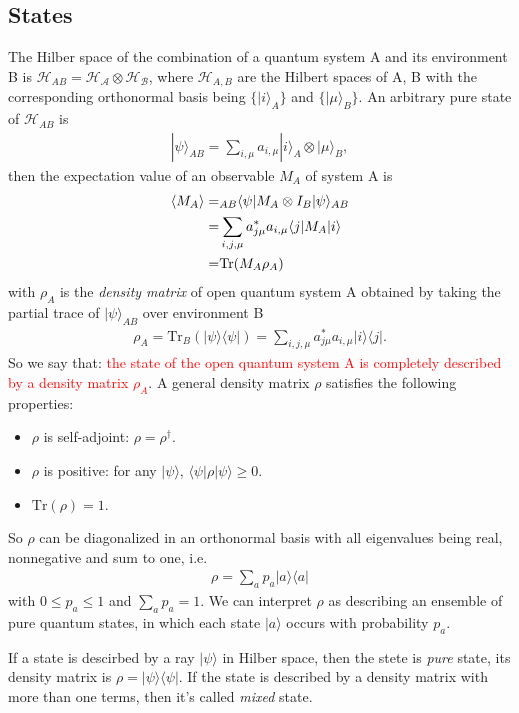 \documentclass{article}
\newcommand{\ket}[1]{| #1 \rangle}  %
\newcommand{\bra}[1]{\langle #1|} %
\newcommand{\expec}[1]{\langle #1 \rangle} %
\begin{document}
\subsection{States}
The Hilber space of the combination of a quantum system A and its environment B is $\mathcal{H}_{AB}=\mathcal{H_A}\otimes \mathcal{H_B}$, where $\mathcal{H}_{A, B}$ are the Hilbert spaces of A, B with the corresponding orthonormal basis being $\{ \ket{i}_A\}$ and $\{\ket{\mu}_B\}$. An arbitrary pure state of $\mathcal{H}_{AB}$ is 
\begin{align}
	\ket{\psi}_{AB}=\sum_{i,\mu} a_{i,\mu} \ket{i}_A \otimes \ket{\mu}_B,
\end{align}
then the expectation value of an observable $M_A$ of system A is
\begin{align}
	\expec{M_A} 
	=& {}_{AB}\bra{\psi} M_A\otimes I_B \ket{\psi}_{AB} \notag\\
	=& \sum_{i,j,\mu} a^*_{j \mu} a_{i, \mu} \bra{j}M_A\ket{i} \notag\\
	=& \text{Tr}(M_A \rho_A)
\end{align}
with $\rho_A$ is the \textit{density matrix} of open quantum system A obtained by taking the partial trace of $\ket{\psi}_{AB}$ over environment B
\begin{align}
	\rho_A = \text{Tr}_B(\ket{\psi}\bra{\psi}) =  \sum_{i,j,\mu} a^*_{j \mu} a_{i, \mu} \ket{i}\bra{j}.
\end{align}
So we say that: \textcolor{red}{the state of the open quantum system A is completely described by a density matrix $\rho_A$}. 
A general density matrix $\rho$ satisfies the following properties:
\begin{itemize}
	\item $\rho$ is self-adjoint: $\rho = \rho^{\dagger}$.
	\item $\rho$ is positive: for any $\ket{\psi}$, $\bra{\psi} \rho \ket{\psi} \ge 0$.
	\item $\text{Tr}(\rho) =1$.
\end{itemize}
So $\rho$ can be diagonalized in an orthonormal basis with all eigenvalues being real, nonnegative and sum to one, i.e. 
\begin{align}
	\rho = \sum_{a} p_a \ket{a} \bra{a}
\end{align}
with $0\le p_a \le 1$ and $\sum_{a} p_a =1$. We can interpret $\rho$ as describing an ensemble of pure quantum states, in which each state $\ket{a}$ occurs with probability $p_a$.

If a state is descirbed by a ray $\ket{\psi}$ in Hilber space, then the stete is \textit{pure} state, its density matrix is $\rho = \ket{\psi}\bra{\psi}$. If the state is described by a density matrix with more than one terms, then it's called \textit{mixed} state.
\end{document}
